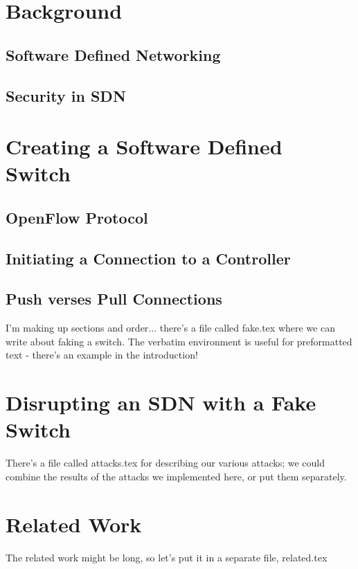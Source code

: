 \documentclass[12pt, letterpaper, twoside]{article}
\begin{document}
\begin{spacing}{1.0}
\begin{multicols}{2}
\section{Background}

\subsection{Software Defined Networking}

\subsection{Security in SDN}

\section{Creating a Software Defined Switch}

\subsection{OpenFlow Protocol}

\subsection{Initiating a Connection to a Controller}

\subsection{Push verses Pull Connections}

\label{fake}
I'm making up sections and order... there's a file called fake.tex where we can write about faking a switch. The verbatim environment is useful for preformatted text - there's an example in the introduction!


\section{Disrupting an SDN with a Fake Switch}
\label{attacks}
There's a file called attacks.tex for describing our various attacks; we could combine the results of the attacks we implemented here, or put them separately.


\section{Related Work}
\label{related}
The related work might be long, so let's put it in a separate file, related.tex



\end{multicols}
\end{spacing}
\end{document}
